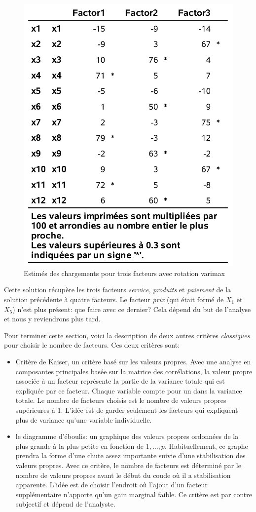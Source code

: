 \documentclass[
]{book}
\providecommand{\tightlist}{%
  \setlength{\itemsep}{0pt}\setlength{\parskip}{0pt}}
\theoremstyle{definition}
\theoremstyle{definition}
\theoremstyle{definition}
\theoremstyle{remark}
\begin{document}
\begin{figure}

{\centering \includegraphics[width=0.55\linewidth]{figures/01-facto-e5} 

}

\caption{Estimés des chargements pour trois facteurs avec rotation varimax}\label{fig:fig1p5}
\end{figure}

Cette solution récupère les trois facteurs \emph{service}, \emph{produits} et \emph{paiement} de la solution précédente à quatre facteurs. Le facteur \emph{prix} (qui était formé de \(X_1\) et \(X_5\)) n'est plus présent: que faire avec ce dernier? Cela dépend du but de l'analyse et nous y reviendrons plus tard.

Pour terminer cette section, voici la description de deux autres
critères \emph{classiques} pour choisir le nombre de facteurs. Ces deux critères sont:

\begin{itemize}
\tightlist
\item
  Critère de Kaiser, un critère basé sur les valeurs propres. Avec une analyse en composantes principales basée sur la matrice des corrélations, la valeur propre associée à un facteur représente la partie de la variance totale qui est expliquée par ce facteur. Chaque variable compte pour un dans la variance totale. Le nombre de facteurs choisis est le nombre de valeurs propres supérieures à 1. L'idée est de garder seulement les facteurs qui expliquent plus de variance qu'une variable individuelle.
\item
  le diagramme d'éboulis: un graphique des valeurs propres ordonnées de la plus grande à la plus petite en fonction de \(1,\ldots, p\). Habituellement, ce graphe prendra la forme d'une chute assez importante suivie d'une stabilisation des valeurs propres. Avec ce critère, le nombre de facteurs est déterminé par le nombre de valeurs propres avant le début du coude où il a stabilisation apparente. L'idée est de choisir l'endroit où l'ajout d'un facteur supplémentaire n'apporte qu'un gain marginal faible. Ce critère est par contre subjectif et dépend de l'analyste.
\end{itemize}
\end{document}
